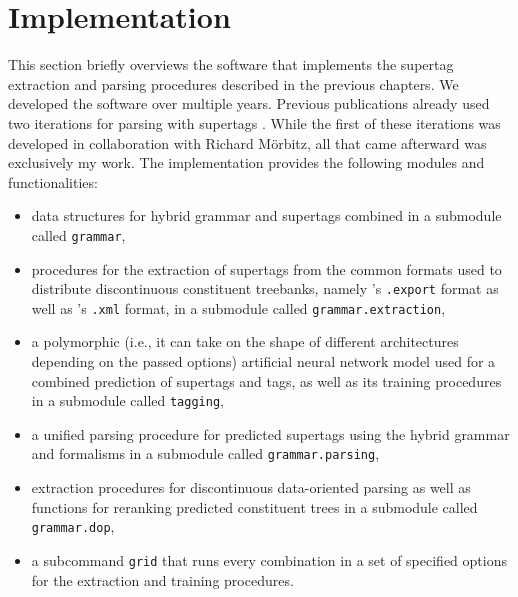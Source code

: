 \documentclass[../../document.tex]{subfiles}
\begin{document}
    \section{Implementation}\label{sec:implementation}
    This section briefly overviews the software that implements the supertag extraction and parsing procedures described in the previous chapters.
    We developed the software over multiple years. Previous publications already used two iterations for parsing with  supertags \citep{RupMoe21,Rup22}.
    While the first of these iterations was developed in collaboration with Richard Mörbitz, all that came afterward was exclusively my work.
    The implementation provides the following modules and functionalities:
    \begin{itemize}
        \item data structures for hybrid grammar and  supertags combined in a submodule called \texttt{grammar},
        \item procedures for the extraction of supertags from the common formats used to distribute discontinuous constituent treebanks, namely \negra{}'s \texttt{.export} format as well as \tiger{}'s \texttt{.xml} format, in a submodule called \texttt{grammar.extraction},
        \item a polymorphic (i.e., it can take on the shape of different architectures depending on the passed options) artificial neural network model used for a combined prediction of supertags and  tags, as well as its training procedures in a submodule called \texttt{tagging},
        \item a unified parsing procedure for predicted supertags using the hybrid grammar and  formalisms in a submodule called \texttt{grammar.parsing},
        \item extraction procedures for discontinuous data-oriented parsing as well as functions for reranking predicted constituent trees in a submodule called \texttt{grammar.dop},
        \item a subcommand \texttt{grid} that runs every combination in a set of specified options for the extraction and training procedures.
    \end{itemize}
\end{document}
